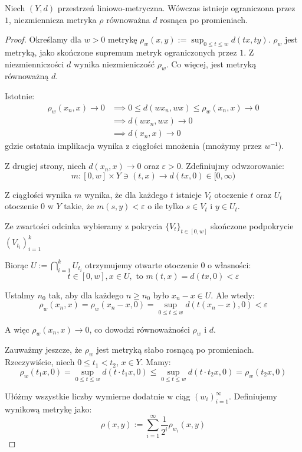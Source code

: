 \begin{thm} \label{thm:eidelheit-mazur}
  Niech $(Y, d)$ przestrzeń liniowo-metryczna. Wówczas istnieje ograniczona przez $1$, niezmiennicza metryka $\rho$ równoważna $d$ rosnąca po promieniach.
  \begin{proof}
    Określamy dla $w > 0$ metrykę $\rho_w(x, y) := \sup_{0 \leq t \leq w} d(tx, ty)$. $\rho_w$ jest metryką, jako skończone supremum metryk ograniczonych przez $1$. Z niezmienniczości $d$ wynika niezmieniczość $\rho_w$. Co więcej, jest metryką równoważną $d$.
    
    Istotnie:
    \begin{align*}
      \rho_w(x_n, x) \to 0 &\implies 0 \leq d(w x_n, wx) \leq \rho_w(x_n,x)  \to 0 \\
      &\implies d(wx_n, wx) \to 0 \\
      &\implies d(x_n, x) \to 0
    \end{align*}
    gdzie ostatnia implikacja wynika z ciągłości mnożenia (mnożymy przez $w^{-1}$).
    
    Z drugiej strony, niech $d(x_n, x) \to 0$ oraz $\varepsilon > 0$. Zdefiniujmy odwzorowanie:
    \[m: [0,w] \times Y \ni (t,x) \to d(tx, 0) \in [0,\infty)\]
    
    Z ciągłości wynika $m$ wynika, że dla każdego $t$ istnieje $V_t$ otoczenie $t$ oraz $U_t$ otoczenie $0$ w $Y$ takie, że $m(s, y) < \varepsilon$ o ile tylko $s \in V_t$ i $y \in U_t$.
    
    Ze zwartości odcinka wybieramy z pokrycia $\{V_t\}_{t \in [0,w]}$ skończone podpokrycie $(V_{t_i})_{i=1}^{k}$
    
    Biorąc $U := \bigcap_{i=1}^k U_{t_i}$ otrzymujemy otwarte otoczenie $0$ o własności:
    \[t \in [0,w], x \in U,\mbox{ to } m(t,x) = d(tx, 0) < \varepsilon\]
    
    Ustalmy $n_0$ tak, aby dla każdego $n \geq n_0$ było $x_n - x \in U$. Ale wtedy:
    \[\rho_w(x_n, x) = \rho_w(x_n - x, 0) = \sup_{0 \leq t \leq w} d(t(x_n - x), 0) < \varepsilon\]
    
    A więc $\rho_w(x_n, x) \to 0$, co dowodzi równoważności $\rho_w$ i $d$.
    
    Zauważmy jeszcze, że $\rho_w$ jest metryką słabo rosnącą po promieniach. Rzeczywiście, niech $0 \leq t_1 < t_2$, $x \in Y$. Mamy:
    \[\rho_w(t_1 x, 0) = \sup_{0 \leq t \leq w} d(t \cdot t_1 x, 0) \leq \sup_{0 \leq t \leq w} d(t \cdot t_2 x, 0) = \rho_w(t_2 x, 0)\]
    
    Ułóżmy wszystkie liczby wymierne dodatnie w ciąg $(w_i)_{i=1}^\infty$. Definiujemy wynikową metrykę jako:
    \[\rho(x, y) := \sum_{i=1}^\infty \frac{1}{2^i} \rho_{w_i}(x, y)\]
    

\end{proof}
\end{thm}
